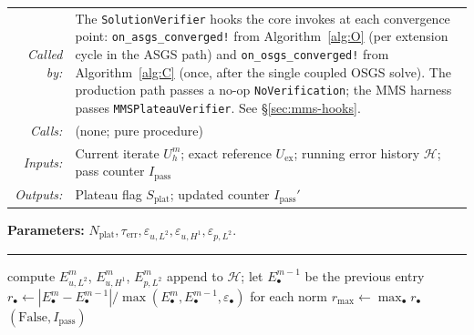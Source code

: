 \documentclass{article}
\newcommand{\code}[1]{\texttt{\small #1}}
\newcommand{\extline}[1]{{\color{extcolor}#1}}
\begin{document}
\begin{tcolorbox}[colback=extcolor!5!white, colframe=extcolor, boxrule=0.4pt, arc=2pt, left=8pt, right=8pt, top=4pt, bottom=4pt, width=\textwidth, before skip=4pt, after skip=2pt]
\footnotesize
\extline{%
\begin{tabular}{@{}r@{\quad}p{}@{}}
\textit{Called by:} & The \code{SolutionVerifier} hooks the core invokes at each convergence point: \code{on\_asgs\_converged!} from Algorithm~\ref{alg:O} (per extension cycle in the ASGS path) and \code{on\_osgs\_converged!} from Algorithm~\ref{alg:C} (once, after the single coupled OSGS solve). The production path passes a no-op \code{NoVerification}; the MMS harness passes \code{MMSPlateauVerifier}. See §\ref{sec:mms-hooks}. \\
\textit{Calls:}     & (none; pure procedure) \\
\textit{Inputs:}    & Current iterate $U_h^m$; exact reference $U_{\mathrm{ex}}$; running error history $\mathcal{H}$; pass counter $I_{\mathrm{pass}}$ \\
\textit{Outputs:}   & Plateau flag $S_{\mathrm{plat}}$; updated counter $I_{\mathrm{pass}}'$ \\
\end{tabular}}
\end{tcolorbox}

\begin{algorithm}[H]
\caption{\extline{$\mathrm{VerifyMMSPlateau}$: relative-change plateau test (optional extension).}}
\label{alg:D}
\SetAlgoLined
\textcolor{extcolor}{\textbf{Parameters:} $N_{\mathrm{plat}}, \tau_{\mathrm{err}}, \varepsilon_{u,L^2}, \varepsilon_{u,H^1}, \varepsilon_{p,L^2}$.\\
\vspace{0.2cm}\hrule\vspace{0.2cm}
compute $E_{u,L^2}^m$, $E_{u,H^1}^m$, $E_{p,L^2}^m$\;
append to $\mathcal{H}$; let $E^{m-1}_\bullet$ be the previous entry\;
$r_\bullet \gets |E_\bullet^m - E_\bullet^{m-1}| / \max(E_\bullet^m, E_\bullet^{m-1}, \varepsilon_\bullet)$ for each norm\;
$r_{\max} \gets \max_\bullet r_\bullet$\;
\Return $(\mathrm{False}, I_{\mathrm{pass}})$ }
\end{algorithm}
\end{document}
